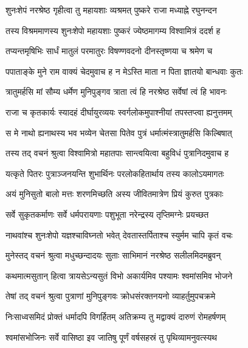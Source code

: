 
\twolineshloka
{शुनःशेपं नरश्रेष्ठ गृहीत्वा तु महायशाः}
{व्यश्रमत् पुष्करे राजा मध्याह्ने रघुनन्दन} %

\twolineshloka
{तस्य विश्रममाणस्य शुनःशेपो महायशाः}
{पुष्करं ज्येष्ठमागम्य विश्वामित्रं ददर्श ह} %

\twolineshloka
{तप्यन्तमृषिभिः सार्धं मातुलं परमातुरः}
{विषण्णवदनो दीनस्तृष्णया च श्रमेण च} %

\twolineshloka
{पपाताङ्के मुने राम वाक्यं चेदमुवाच ह}
{न मेऽस्ति माता न पिता ज्ञातयो बान्धवाः कुतः} %

\twolineshloka
{त्रातुमर्हसि मां सौम्य धर्मेण मुनिपुङ्गव}
{त्राता त्वं हि नरश्रेष्ठ सर्वेषां त्वं हि भावनः} %

\twolineshloka
{राजा च कृतकार्यः स्यादहं दीर्घायुरव्ययः}
{स्वर्गलोकमुपाश्नीयां तपस्तप्त्वा ह्यनुत्तमम्} %

\twolineshloka
{स मे नाथो ह्यनाथस्य भव भव्येन चेतसा}
{पितेव पुत्रं धर्मात्मंस्त्रातुमर्हसि किल्बिषात्} %

\twolineshloka
{तस्य तद् वचनं श्रुत्वा विश्वामित्रो महातपाः}
{सान्त्वयित्वा बहुविधं पुत्रानिदमुवाच ह} %

\twolineshloka
{यत्कृते पितरः पुत्राञ्जनयन्ति शुभार्थिनः}
{परलोकहितार्थाय तस्य कालोऽयमागतः} %

\twolineshloka
{अयं मुनिसुतो बालो मत्तः शरणमिच्छति}
{अस्य जीवितमात्रेण प्रियं कुरुत पुत्रकाः} %

\twolineshloka
{सर्वे सुकृतकर्माणः सर्वे धर्मपरायणाः}
{पशुभूता नरेन्द्रस्य तृप्तिमग्नेः प्रयच्छत} %

\twolineshloka
{नाथवांश्च शुनःशेपो यज्ञश्चाविघ्नतो भवेत्}
{देवतास्तर्पिताश्च स्युर्मम चापि कृतं वचः} %

\twolineshloka
{मुनेस्तद् वचनं श्रुत्वा मधुच्छन्दादयः सुताः}
{साभिमानं नरश्रेष्ठ सलीलमिदमब्रुवन्} %

\twolineshloka
{कथमात्मसुतान् हित्वा त्रायसेऽन्यसुतं विभो}
{अकार्यमिव पश्यामः श्वमांसमिव भोजने} %

\twolineshloka
{तेषां तद् वचनं श्रुत्वा पुत्राणां मुनिपुङ्गवः}
{क्रोधसंरक्तनयनो व्याहर्तुमुपचक्रमे} %

\twolineshloka
{निःसाध्वसमिदं प्रोक्तं धर्मादपि विगर्हितम्}
{अतिक्रम्य तु मद्वाक्यं दारुणं रोमहर्षणम्} %

\twolineshloka
{श्वमांसभोजिनः सर्वे वासिष्ठा इव जातिषु}
{पूर्णं वर्षसहस्रं तु पृथिव्यामनुवत्स्यथ} %

